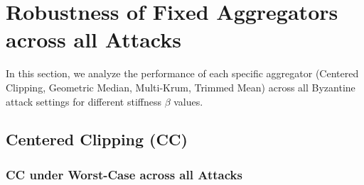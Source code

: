 \documentclass{article}
\begin{document}
\clearpage
\section{Robustness of Fixed Aggregators across all Attacks}
In this section, we analyze the performance of each specific aggregator (Centered Clipping, Geometric Median, Multi-Krum, Trimmed Mean) across all Byzantine attack settings for different stiffness $\beta$ values.

\clearpage
\subsection{Centered Clipping (CC)}
\subsubsection{CC under Worst-Case across all Attacks}
\end{document}
